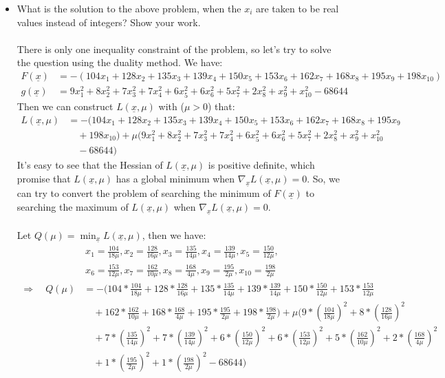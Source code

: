 \documentclass[11pt,letterpaper]{article}
\begin{document}
\begin{tcolorbox}
    \begin{itemize}
        \item What is the solution to the above problem, when the $x_i$ are taken to be real values instead of integers? Show your work.
        \\\\ There is only one inequality constraint of the problem, so let's try to solve the question using the duality method. We have:
        \begin{align*}
            F(\underline x) &= -(104x_1 + 128x_2 + 135x_3 + 139x_4 + 150x_5 + 153x_6 + 162x_7 + 168x_8 + 195x_9 + 198x_{10})\\
            g(\underline x) &= 9x^2_1 +8x^2_2 +7x^2_3 +7x^2_4 +6x^2_5 +6x^2_6 +5x^2_7 +2x^2_8 +x^2_9 +x^2_{10} - 68644
        \end{align*}
        Then we can construct $L(\underline x, \mu)$ with ($\mu>0$) that:
        \begin{align*}
            L(\underline x, \mu) &= 
            -(104x_1 + 128x_2 + 135x_3 + 139x_4 + 150x_5 + 153x_6 + 162x_7 + 168x_8 + 195x_9\\ &\quad + 198x_{10})
            + \mu(9x^2_1 +8x^2_2 +7x^2_3 +7x^2_4 +6x^2_5 +6x^2_6 +5x^2_7 +2x^2_8 +x^2_9 +x^2_{10} \\ &\quad - 68644)
        \end{align*}
        It's easy to see that the Hessian of $L(\underline x, \mu)$ is positive definite, which promise that $L(\underline x, \mu)$ has a global minimum when $\nabla_{\underline x} L(\underline x, \mu) = 0$. So, we can try to convert the problem of searching the minimum of $F(\underline x)$ to searching the maximum of $L(\underline x, \mu)$ when $\nabla_{\underline x} L(\underline x, \mu) = 0$.
        \\\\
        Let $Q(\mu) = \min_{\underline x} L(\underline x, \mu)$, then we have:
        \begin{align*}
            x_1 = \frac{104}{18\mu}, x_2 = \frac{128}{16\mu}, x_3 = \frac{135}{14\mu}, x_4 = \frac{139}{14\mu}, x_5 = \frac{150}{12\mu}, \\x_6 = \frac{153}{12\mu}, 
            x_7 = \frac{162}{10\mu}, x_8 = \frac{168}{4\mu}, x_9 = \frac{195}{2\mu}, x_{10} = \frac{198}{2\mu}
        \end{align*}
        \begin{align*}
            \Rightarrow \quad Q(\mu) &= -(104 * \frac{104}{18\mu} + 128 * \frac{128}{16\mu} + 135 * \frac{135}{14\mu} + 139 * \frac{139}{14\mu} + 150 * \frac{150}{12\mu} + 153 * \frac{153}{12\mu} \\ &\quad + 162 * \frac{162}{10\mu} + 168 * \frac{168}{4\mu} + 195 * \frac{195}{2\mu} + 198 * \frac{198}{2\mu}) + \mu(9 * (\frac{104}{18\mu})^2 + 8 * (\frac{128}{16\mu})^2 \\& \quad + 7* (\frac{135}{14\mu})^2 + 7 * (\frac{139}{14\mu})^2 + 6 * (\frac{150}{12\mu})^2 + 6 * (\frac{153}{12\mu})^2 + 5 * (\frac{162}{10\mu})^2 + 2 * (\frac{168}{4\mu})^2 \\ &\quad + 1 * (\frac{195}{2\mu})^2 + 1 * (\frac{198}{2\mu})^2 - 68644)

\end{align*}
\end{itemize}
\end{tcolorbox}
\end{document}

